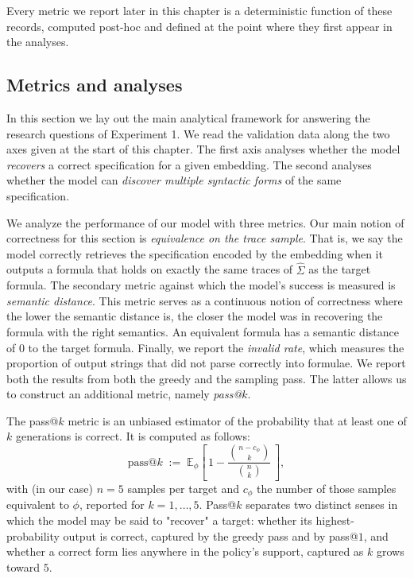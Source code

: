 \documentclass[titlepage,a4paper,11pt]{report}
\DeclareRobustCommand{\RSnew}[1]{{\color{blue!65!black}#1}}
\begin{document}
    Every metric we report later in this chapter is a deterministic function of these records, computed post-hoc and defined at the point where they first appear in the analyses.

    
    \subsection{Metrics and analyses}\label{sec:exp1_analyses}
    In this section we lay out the main analytical framework for answering the research questions of Experiment 1. We read the validation data along the two axes \RSnew{given at the start of this chapter}. The first axis analyses whether the model \emph{recovers} a correct specification for a given embedding. The second analyses whether the model can \emph{discover multiple syntactic forms} of the same specification. 
    
    We analyze the performance of our model with three metrics. Our main notion of correctness for this section is \textit{equivalence on the trace sample}. That is, we say the model correctly retrieves the specification encoded by the embedding when it outputs a formula that holds on exactly the same traces of $\widehat\Sigma$ as the target formula. The secondary metric against which the model's success is measured is \textit{semantic distance}. This metric serves as a continuous notion of correctness where the lower the semantic distance is, the closer the model was in recovering the formula with the right semantics. An equivalent formula has a semantic distance of 0 to the target formula. Finally, we report the \textit{invalid rate}, which measures the proportion of output strings that did not parse correctly into formulae.  We report both the results from both the greedy and the sampling pass. The latter allows us to construct an additional metric, namely \textit{pass@$k$}.

    The pass@$k$ metric is an unbiased estimator \citep{chen_evaluating_2021} of the probability that at least one of $k$ generations is correct. It is computed as follows:
    \begin{equation}\label{eq:pass_at_k}
        \mathrm{pass@}k \;:=\; \mathbb{E}_{\phi}\!\left[\, 1 - \frac{\binom{n - c_\phi}{k}}{\binom{n}{k}} \,\right],
    \end{equation}
    with (in our case) $n = 5$ samples per target and $c_\phi$ the number of those samples equivalent to $\phi$, reported for $k = 1, \dots, 5$. Pass@$k$ separates two distinct senses in which the model may be said to "recover" a target: whether its highest-probability output is correct, captured by the greedy pass and by pass@$1$, and whether a correct form lies anywhere in the policy's support, captured as $k$ grows toward $5$.
\end{document}
